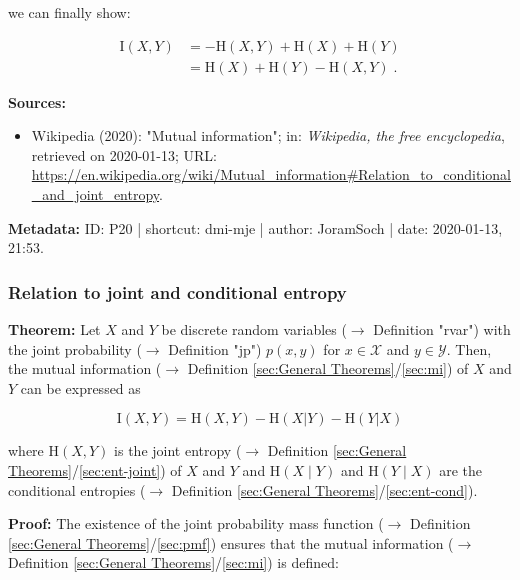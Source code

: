 \documentclass[a4paper,12pt]{book}
\begin{document}
we can finally show:

\begin{equation} \label{eq:dmi-mje-MI-qed}
\begin{split}
\mathrm{I}(X,Y) &= - \mathrm{H}(X,Y) + \mathrm{H}(X) + \mathrm{H}(Y) \\
&= \mathrm{H}(X) + \mathrm{H}(Y) - \mathrm{H}(X,Y) \; .
\end{split}
\end{equation}

\vspace{1em}
\textbf{Sources:}
\begin{itemize}
\item Wikipedia (2020): "Mutual information"; in: \textit{Wikipedia, the free encyclopedia}, retrieved on 2020-01-13; URL: \url{https://en.wikipedia.org/wiki/Mutual_information#Relation_to_conditional_and_joint_entropy}.
\end{itemize}


\vspace{1em}
\textbf{Metadata:} ID: P20 | shortcut: dmi-mje | author: JoramSoch | date: 2020-01-13, 21:53.


\subsubsection[\textbf{Relation to joint and conditional entropy}]{Relation to joint and conditional entropy} \label{sec:dmi-jce}

\vspace{1em}
\textbf{Theorem:} Let $X$ and $Y$ be discrete random variables ($\rightarrow$ Definition "rvar") with the joint probability ($\rightarrow$ Definition "jp") $p(x,y)$ for $x \in \mathcal{X}$ and $y \in \mathcal{Y}$. Then, the mutual information ($\rightarrow$ Definition \ref{sec:General Theorems}/\ref{sec:mi}) of $X$ and $Y$ can be expressed as

\begin{equation} \label{eq:dmi-jce-dmi-jce}
\mathrm{I}(X,Y) = \mathrm{H}(X,Y) - \mathrm{H}(X|Y) - \mathrm{H}(Y|X)
\end{equation}

where $\mathrm{H}(X,Y)$ is the joint entropy ($\rightarrow$ Definition \ref{sec:General Theorems}/\ref{sec:ent-joint}) of $X$ and $Y$ and $\mathrm{H}(X \mid Y)$ and $\mathrm{H}(Y \mid X)$ are the conditional entropies ($\rightarrow$ Definition \ref{sec:General Theorems}/\ref{sec:ent-cond}).


\vspace{1em}
\textbf{Proof:} The existence of the joint probability mass function ($\rightarrow$ Definition \ref{sec:General Theorems}/\ref{sec:pmf}) ensures that the mutual information ($\rightarrow$ Definition \ref{sec:General Theorems}/\ref{sec:mi}) is defined:
\end{document}
